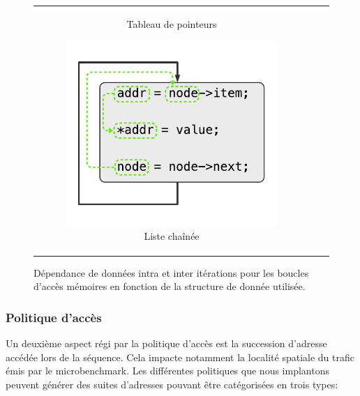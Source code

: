 \begin{figure}
\begin{tabular}{c c c}
\begin{subfigure}{0.33 \linewidth}
			\caption{\label{fig:lookup-deps}Tableau de pointeurs}
		\end{subfigure}
		\begin{subfigure}{0.33 \linewidth}
			\includegraphics[width=\linewidth]{graphics/figures/list-dependencies.pdf}
			\caption{\label{fig:list-deps}Liste chaînée}
		\end{subfigure}
	\end{tabular}
	\caption{\label{fig:datastruct-deps}Dépendance de données intra et inter itérations pour les boucles d'accès mémoires en fonction de la structure de donnée utilisée.}
\end{figure}

\subsubsection{Politique d'accès}

Un deuxième aspect régi par la politique d'accès est la succession d'adresse accédée lors de la séquence.
Cela impacte notamment la localité spatiale du trafic émis par le microbenchmark.
Les différentes politiques que nous implantons peuvent générer des suites d'adresses pouvant être catégorisées en trois types:

